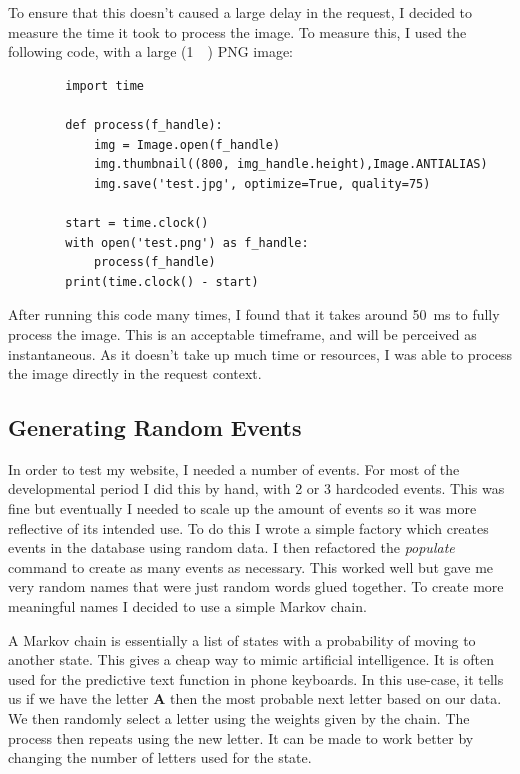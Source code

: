 \documentclass[a4paper,oneside,12pt]{report}
\begin{document}
	To ensure that this doesn't caused a large delay in the request, I decided to measure the time it took to process the image. To measure this, I used the following code, with a large (\SI{1}{\mega\byte}) PNG image:

	\lstset{language=python}
	\begin{lstlisting}
		import time

		def process(f_handle):
			img = Image.open(f_handle)
			img.thumbnail((800, img_handle.height),Image.ANTIALIAS)
			img.save('test.jpg', optimize=True, quality=75)

		start = time.clock()
		with open('test.png') as f_handle:
			process(f_handle)
		print(time.clock() - start)
	\end{lstlisting}

	After running this code many times, I found that it takes around \SI{50}{\milli\second} to fully process the image. This is an acceptable timeframe, and will be perceived as instantaneous. As it doesn't take up much time or resources, I was able to process the image directly in the request context. 

	\subsection{Generating Random Events}
	In order to test my website, I needed a number of events. For most of the developmental period I did this by hand, with 2 or 3 hardcoded events. This was fine but eventually I needed to scale up the amount of events so it was more reflective of its intended use. To do this I wrote a simple factory which creates events in the database using random data. I then refactored the \textit{populate} command to create as many events as necessary. This worked well but gave me very random names that were just random words glued together. To create more meaningful names I decided to use a simple Markov chain.

	A Markov chain is essentially a list of states with a probability of moving to another state. This gives a cheap way to mimic artificial intelligence. It is often used for the predictive text function in phone keyboards. In this use-case, it tells us if we have the letter \textbf{A} then the most probable next letter based on our data. We then randomly select a letter using the weights given by the chain. The process then repeats using the new letter. It can be made to work better by changing the number of letters used for the state.
\end{document}
